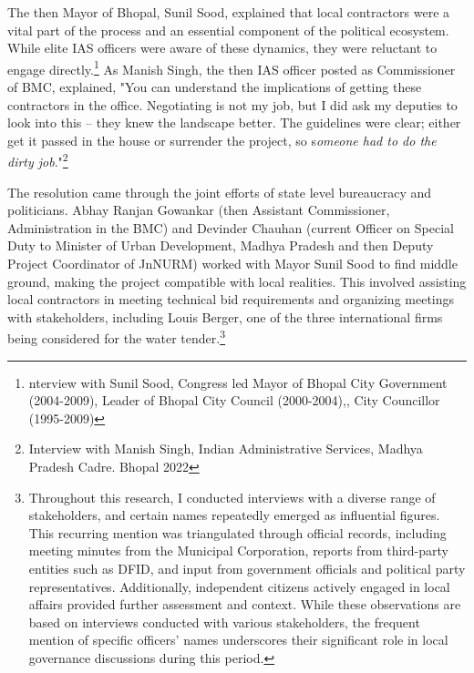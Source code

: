 The then Mayor of Bhopal, Sunil Sood, explained that local contractors were a vital part of the process and an essential component of the political ecosystem. While elite IAS officers were aware of these dynamics, they were reluctant to engage directly.\footnote{nterview with Sunil Sood, Congress led Mayor of Bhopal City Government (2004-2009), Leader of Bhopal City Council (2000-2004),, City Councillor (1995-2009) } As Manish Singh, the then IAS officer posted as Commissioner of BMC, explained, "You can understand the implications of getting these contractors in the office. Negotiating is not my job, but I did ask my deputies to look into this – they knew the landscape better. The guidelines were clear; either get it passed in the house or surrender the project, so s\textit{omeone had to do the dirty job}."\footnote{Interview with Manish Singh, Indian Administrative Services, Madhya Pradesh Cadre. Bhopal 2022
}

The resolution came through the joint efforts of state level bureaucracy and politicians. Abhay Ranjan Gowankar (then Assistant Commissioner, Administration in the BMC) and Devinder Chauhan (current Officer on Special Duty to Minister of Urban Development, Madhya Pradesh and then Deputy Project Coordinator of JnNURM) worked with Mayor Sunil Sood to find middle ground, making the project compatible with local realities. This involved assisting local contractors in meeting technical bid requirements and organizing meetings with stakeholders, including Louis Berger, one of the three international firms being considered for the water tender.\footnote{Throughout this research, I conducted interviews with a diverse range of stakeholders, and certain names repeatedly emerged as influential figures. This recurring mention was triangulated through official records, including meeting minutes from the Municipal Corporation, reports from third-party entities such as DFID, and input from government officials and political party representatives. Additionally, independent citizens actively engaged in local affairs provided further assessment and context. While these observations are based on interviews conducted with various stakeholders, the frequent mention of specific officers’ names underscores their significant role in local governance discussions during this period.}

